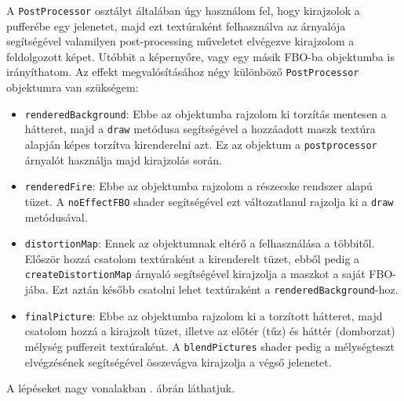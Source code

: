 A \texttt{PostProcessor} osztályt általában úgy használom fel, hogy kirajzolok a pufferébe egy jelenetet, majd ezt textúraként felhasználva az árnyalója segítségével valamilyen post-processing műveletet elvégezve kirajzolom a feldolgozott képet. Utóbbit a képernyőre, vagy egy másik FBO-ba objektumba is irányíthatom. Az effekt megvalósításához négy különböző \texttt{PostProcessor} objektumra van szükségem:
\begin{itemize}
\item  \texttt{renderedBackground}: Ebbe az objektumba rajzolom ki torzítás mentesen a hátteret, majd a \texttt{draw} metódusa segítségével a hozzáadott maszk textúra alapján képes torzítva kirenderelni azt. Ez az objektum a \texttt{postprocessor} árnyalót használja majd kirajzolás során.
\item \texttt{renderedFire}: Ebbe az objektumba rajzolom a részecske rendszer alapú tüzet. A \texttt{noEffectFBO} shader segítségével ezt változatlanul rajzolja ki a \texttt{draw} metódusával.
\item \texttt{distortionMap}: Ennek az objektumnak eltérő a felhasználása a többitől. Először hozzá csatolom textúraként a kirenderelt tüzet, ebből pedig a \texttt{createDistortionMap} árnyaló segítségével kirajzolja a maszkot a saját FBO-jába. Ezt aztán később csatolni lehet textúraként a \texttt{renderedBackground}-hoz.
\item \texttt{finalPicture}: Ebbe az objektumba rajzolom ki a torzított hátteret, majd csatolom hozzá a kirajzolt tüzet, illetve az előtér (tűz) és háttér (domborzat) mélység puffereit textúraként. A \texttt{blendPictures} shader pedig a mélységteszt elvégzésének segítségével összevágva kirajzolja a végső jelenetet.
\end{itemize}
A lépéseket nagy vonalakban . ábrán láthatjuk.

